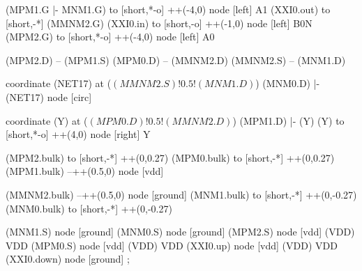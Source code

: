\begin{circuitikz}[american]
	(MPM1.G |- MNM1.G) to [short,*-o] ++(-4,0) node [left] {A1}
	(XXI0.out) to [short,-*] (MMNM2.G)
	(XXI0.in) to [short,-o] ++(-1,0) node [left] {B0N}
	(MPM2.G) to [short,*-o] ++(-4,0) node [left] {A0}
	
	(MPM2.D) -- (MPM1.S)
	(MPM0.D) -- (MMNM2.D)
	(MMNM2.S) -- (MNM1.D)
	
	coordinate (NET17) at ($(MMNM2.S)!0.5!(MNM1.D)$)
	(MNM0.D) |- (NET17) node [circ] {}
	
	coordinate (Y) at ($(MPM0.D)!0.5!(MMNM2.D)$)
	(MPM1.D) |- (Y)
	(Y) to [short,*-o] ++(4,0) node [right] {Y}
	
	(MPM2.bulk) to [short,-*] ++(0,0.27)
	(MPM0.bulk) to [short,-*] ++(0,0.27)	
	(MPM1.bulk) --++(0.5,0) node [vdd]{}
	
	(MMNM2.bulk) --++(0.5,0) node [ground]{}
	(MNM1.bulk) to [short,-*] ++(0,-0.27) 
	(MNM0.bulk) to [short,-*] ++(0,-0.27) 


	(MNM1.S) node [ground] {}
	(MNM0.S) node [ground] {}
	(MPM2.S) node [vdd] (VDD) {VDD}
	(MPM0.S) node [vdd] (VDD) {VDD}
	(XXI0.up) node [vdd] (VDD) {VDD}
	(XXI0.down) node [ground] {}
;

\end{circuitikz}
